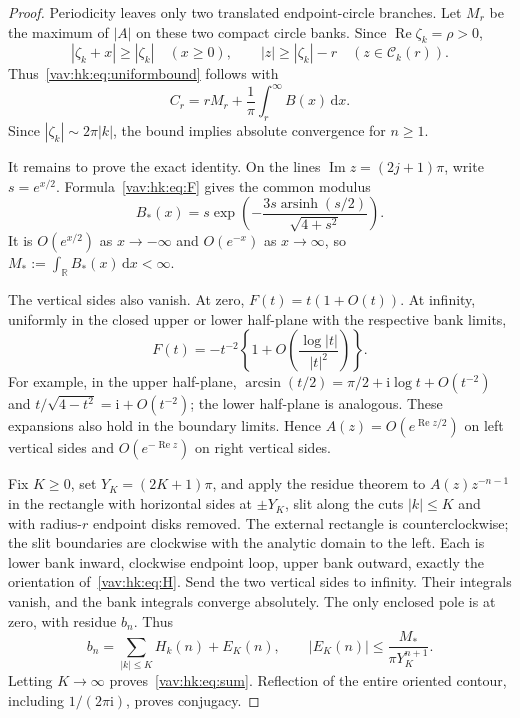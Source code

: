 \documentclass[11pt]{article}
\theoremstyle{remark}\newtheorem{remark}[theorem]{Remark}
\newcommand{\ii}{\mathrm i}
\newcommand{\dd}{\,\mathrm d}
\newcommand{\Rea}{\operatorname{Re}}
\newcommand{\Ima}{\operatorname{Im}}
\newcommand{\asinh}{\operatorname{arsinh}}
\newcommand{\R}{\mathbb R}
\begin{document}
\begin{proof}
Periodicity leaves only two translated endpoint-circle branches. Let $M_r$ be the maximum of $|A|$ on these two compact circle banks. Since $\Rea\zeta_k=\rho>0$,
\[
 |\zeta_k+x|\geq|\zeta_k|\quad(x\geq0),\qquad
 |z|\geq|\zeta_k|-r\quad(z\in \mathcal C_k(r)).
\]
Thus~\eqref{vav:hk:eq:uniformbound} follows with
\[
 C_r=rM_r+\frac1\pi\int_r^\infty B(x)\dd x.
\]
Since $|\zeta_k|\sim2\pi|k|$, the bound implies absolute convergence for $n\geq1$.

It remains to prove the exact identity. On the lines $\Ima z=(2j+1)\pi$, write $s=e^{x/2}$. Formula~\eqref{vav:hk:eq:F} gives the common modulus
\begin{equation}\label{vav:hk:eq:strip}
 B_*(x)=s\exp\left(-\frac{3s\asinh(s/2)}{\sqrt{4+s^2}}\right).
\end{equation}
It is $O(e^{x/2})$ as $x\to-\infty$ and $O(e^{-x})$ as $x\to\infty$, so $M_*:=\int_\R B_*(x)\dd x<\infty$.

The vertical sides also vanish. At zero, $F(t)=t(1+O(t))$. At infinity, uniformly in the closed upper or lower half-plane with the respective bank limits,
\begin{equation}\label{vav:hk:eq:infinity}
 F(t)=-t^{-2}\left\{1+O\left(\frac{\log|t|}{|t|^2}\right)\right\}.
\end{equation}
For example, in the upper half-plane,
$\arcsin(t/2)=\pi/2+\ii\log t+O(t^{-2})$ and
$t/\sqrt{4-t^2}=\ii+O(t^{-2})$; the lower half-plane is analogous. These expansions also hold in the boundary limits. Hence $A(z)=O(e^{\Rea z/2})$ on left vertical sides and $O(e^{-\Rea z})$ on right vertical sides.

Fix $K\geq0$, set $Y_K=(2K+1)\pi$, and apply the residue theorem to $A(z)z^{-n-1}$ in the rectangle with horizontal sides at $\pm Y_K$, slit along the cuts $|k|\leq K$ and with radius-$r$ endpoint disks removed. The external rectangle is counterclockwise; the slit boundaries are clockwise with the analytic domain to the left. Each is lower bank inward, clockwise endpoint loop, upper bank outward, exactly the orientation of~\eqref{vav:hk:eq:H}. Send the two vertical sides to infinity. Their integrals vanish, and the bank integrals converge absolutely. The only enclosed pole is at zero, with residue $b_n$. Thus
\begin{equation}\label{vav:hk:eq:recterror}
 b_n=\sum_{|k|\leq K}H_k(n)+E_K(n),\qquad
 |E_K(n)|\leq\frac{M_*}{\pi Y_K^{n+1}}.
\end{equation}
Letting $K\to\infty$ proves~\eqref{vav:hk:eq:sum}. Reflection of the entire oriented contour, including $1/(2\pi\ii)$, proves conjugacy.
\end{proof}
\end{document}

